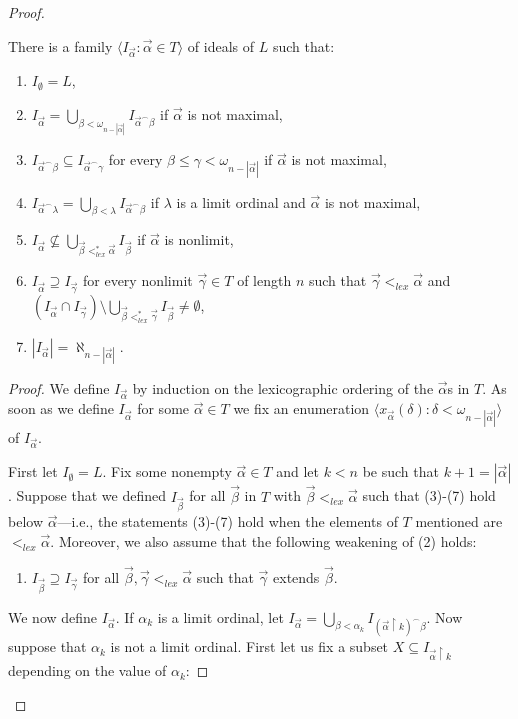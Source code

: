 \documentclass[10pt,a4paper]{amsart}
\begin{document}
\begin{proof}
\begin{claim}\label{prop:wehrung:claim:1}
There is a family $\langle I_{\vec{\alpha}} : \vec{\alpha} \in T\rangle$ of ideals  of $L$ such that:
\begin{enumerate}[label={\upshape (\arabic*)}]
\item $I_{\emptyset} = L$,
\item $I_{\vec{\alpha}} = \bigcup_{\beta < \omega_{n-|\vec{\alpha}|}} I_{\vec{\alpha}^\smallfrown \beta}$ if $\vec{\alpha}$ is not maximal,
\item $I_{\vec{\alpha}^\smallfrown \beta} \subseteq I_{\vec{\alpha}^\smallfrown \gamma}$ for every $\beta \le \gamma < \omega_{n-|\vec{\alpha}|}$ if $\vec{\alpha}$ is not maximal,
\item $I_{\vec{\alpha}^\smallfrown \lambda} = \bigcup_{\beta < \lambda} I_{\vec{\alpha}^\smallfrown \beta}$ if $\lambda$ is a limit ordinal and $\vec{\alpha}$ is not maximal,
\item $I_{\vec{\alpha}} \nsubseteq \bigcup_{\vec{\beta} <_{lex}^* \vec{\alpha}} I_{\vec{\beta}}$ if $\vec{\alpha}$ is nonlimit,
\item $I_{\vec{\alpha}} \supseteq I_{\vec{\gamma}}$ for every nonlimit $\vec{\gamma} \in T$ of length $n$ such that $\vec{\gamma} <_{lex} \vec{\alpha}$ and $(I_{\vec{\alpha}} \cap I_{\vec{\gamma}}) \setminus \bigcup_{\vec{\beta} <_{lex}^* \vec{\gamma}} I_{\vec{\beta}} \neq \emptyset$,
\item $|I_{\vec{\alpha}}| = \aleph_{n-|\vec{\alpha}|}$.
\end{enumerate}
\end{claim}
\begin{proof}
We define $I_{\vec{\alpha}}$ by induction on the lexicographic ordering of the $\vec{\alpha}$s in $T$. As soon as we define $I_{\vec{\alpha}}$ for some $\vec{\alpha} \in T$ we fix an enumeration $\langle x_{\vec{\alpha}}(\delta) : \delta < \omega_{n-|\vec{\alpha}|} \rangle$ of $I_{\vec{\alpha}}$. 

First let $I_{\emptyset} = L$. Fix some nonempty $\vec{\alpha} \in T$ and let $k < n$ be such that $k+1 = |\vec{\alpha}|$. Suppose that we defined $I_{\vec{\beta}}$ for all $\vec{\beta}$ in $T$ with $\vec{\beta} <_{lex} \vec{\alpha}$ such that (3)-(7) hold below $\vec{\alpha}$---i.e., the statements (3)-(7) hold when the elements of $T$ mentioned are $<_{lex} \vec{\alpha}$. Moreover, we also assume that the following weakening of (2) holds:
\begin{enumerate}
\item[(2')] $I_{\vec{\beta}} \supseteq I_{\vec{\gamma}}$ for all $\vec{\beta},\vec{\gamma} <_{lex} \vec{\alpha}$ such that $\vec{\gamma}$ extends $\vec{\beta}$.
\end{enumerate} 
We now define $I_{\vec{\alpha}}$. If $\alpha_k$ is a limit ordinal, let $I_{\vec{\alpha}} = \bigcup_{\beta < \alpha_k} I_{(\vec{\alpha} \upharpoonright k)^\smallfrown \beta}$. Now suppose that $\alpha_k$ is not a limit ordinal. First let us fix a subset $X \subseteq I_{\vec{\alpha} \upharpoonright k}$ depending on the value of $\alpha_k$:\vspace{0.5em}


\end{proof}
\end{proof}
\end{document}
